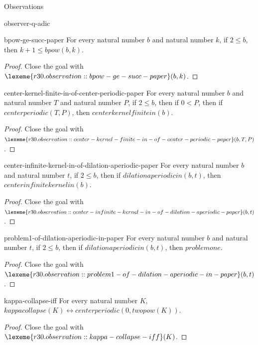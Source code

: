 \begin{lexlean}{Observations}
\begin{section}{observer-q-adic}
\begin{theorem}{bpow-ge-succ-paper}
For every natural number \(b\) and natural number \(k\), if \(2 ≤ b\), then \(k + 1 ≤ bpow(b, k)\).
\begin{proof}
Close the goal with \(\lexeme{r30.observation::bpow-ge-succ-paper}(b, k)\).
\end{proof}
\end{theorem}

\begin{theorem}{center-kernel-finite-in-of-center-periodic-paper}
For every natural number \(b\) and natural number \(T\) and natural number \(P\), if \(2 ≤ b\), then if \(0 < P\), then if \(centerperiodic(T, P)\), then \(centerkernelfinitein(b)\).
\begin{proof}
Close the goal with \(\lexeme{r30.observation::center-kernel-finite-in-of-center-periodic-paper}(b, T, P)\).
\end{proof}
\end{theorem}

\begin{theorem}{center-infinite-kernel-in-of-dilation-aperiodic-paper}
For every natural number \(b\) and natural number \(t\), if \(2 ≤ b\), then if \(dilationaperiodicin(b, t)\), then \(centerinfinitekernelin(b)\).
\begin{proof}
Close the goal with \(\lexeme{r30.observation::center-infinite-kernel-in-of-dilation-aperiodic-paper}(b, t)\).
\end{proof}
\end{theorem}

\begin{theorem}{problem1-of-dilation-aperiodic-in-paper}
For every natural number \(b\) and natural number \(t\), if \(2 ≤ b\), then if \(dilationaperiodicin(b, t)\), then \(problemone\).
\begin{proof}
Close the goal with \(\lexeme{r30.observation::problem1-of-dilation-aperiodic-in-paper}(b, t)\).
\end{proof}
\end{theorem}

\begin{theorem}{kappa-collapse-iff}
For every natural number \(K\), \(kappacollapse(K) ↔ centerperiodic(0, twopow(K))\).
\begin{proof}
Close the goal with \(\lexeme{r30.observation::kappa-collapse-iff}(K)\).
\end{proof}
\end{theorem}


\end{section}
\end{lexlean}
